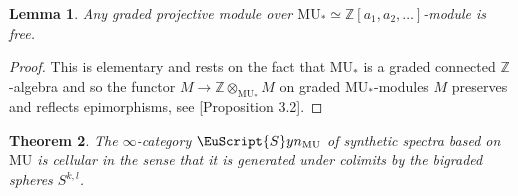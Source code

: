 \documentclass[oneside,a4paper]{amsart}
\newcommand{\euscr}[1]{\EuScript{#1}} %
\newcommand{\MU}{\mathrm{MU}} %
\newcommand{\synspectra}{\euscr{S}yn} %
\theoremstyle{plain}
\newtheorem{thm}{Theorem}[section]
\newtheorem{lemma}[thm]{Lemma}
\theoremstyle{definition}
\theoremstyle{remark}
\begin{document}
\begin{lemma}
\label{lemma:projective_mu_module_necessarily_free}
Any graded projective module over $\MU_{*} \simeq \mathbb{Z}[a_{1}, a_{2}, \ldots]$-module is free. 
\end{lemma}

\begin{proof}
This is elementary and rests on the fact that $\MU_{*}$ is a graded connected $\mathbb{Z}$-algebra and so the functor $M \rightarrow \mathbb{Z} \otimes _{\MU_{*}} M$ on graded $\MU_{*}$-modules $M$ preserves and reflects epimorphisms, see \cite{conner1969complex}[Proposition 3.2]. 
\end{proof}

\begin{thm}
\label{thm:synthetic_spectra_based_on_mu_are_cellular}
The $\infty$-category $\synspectra_{\MU}$ of synthetic spectra based on $\MU$ is cellular in the sense that it is generated under colimits by the bigraded spheres $S^{k, l}$. 
\end{thm}
\end{document}

